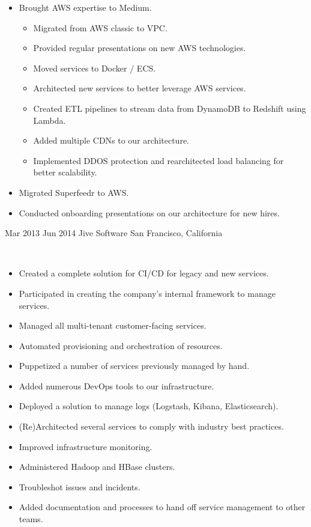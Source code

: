 \documentclass[]{cv-style}          %
\begin{document}
\begin{entrylist}
{\begin{itemize}
\begin{itemize}
\end{itemize}
\item Brought AWS expertise to Medium.
\begin{itemize}
\item Migrated from AWS classic to VPC.
\item Provided regular presentations on new AWS technologies.
\item Moved services to Docker / ECS.
\item Architected new services to better leverage AWS services.
\item Created ETL pipelines to stream data from DynamoDB to Redshift using Lambda.
\item Added multiple CDNs to our architecture.
\item Implemented DDOS protection and rearchitected load balancing for better scalability.
\end{itemize}
\item Migrated Superfeedr to AWS.
\item Conducted onboarding presentations on our architecture for new hires.
\end{itemize}\vspace{+10pt}}
\entry
{Mar 2013 \newline Jun 2014}
{Jive Software}
{San Francisco, California}
{ \\
\begin{itemize}
\item Created a complete solution for CI/CD for legacy and new services.
\item Participated in creating the company's internal framework to manage services.
\item Managed all multi-tenant customer-facing services.
\item Automated provisioning and orchestration of resources.
\item Puppetized a number of services previously managed by hand.
\item Added numerous DevOps tools to our infrastructure.
\item Deployed a solution to manage logs (Logstash, Kibana, Elasticsearch).
\item (Re)Architected several services to comply with industry best practices.
\item Improved infrastructure monitoring.
\item Administered Hadoop and HBase clusters.
\item Troubleshot issues and incidents.
\item Added documentation and processes to hand off service management to other teams.
\end{itemize}\vspace{+10pt}}
\end{entrylist}
\newpage
\end{document}
